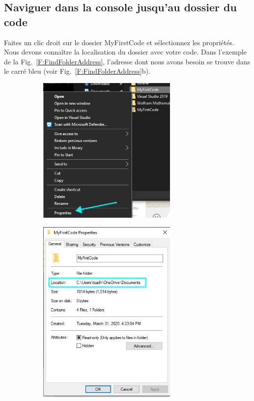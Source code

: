 \documentclass{article}
\newcommand\subfig[2]{{Fig.~\ref{#1}{#2}}}
\newcommand\fig[1]{{Fig.~\ref{#1}}}
\begin{document}
\subsection{Naviguer dans la console jusqu'au dossier du code\label{S:GoToFolder}}
Faites un clic droit sur le dossier MyFirstCode et sélectionnez les propriétés. Nous devons connaître la localisation du dossier avec votre code. Dans l'exemple de la \fig{F:FindFolderAddress}, l'adresse dont nous avons besoin se trouve dans le carré bleu (voir \subfig{F:FindFolderAddress}{b}).
\begin{figure}[H]
\begin{subfigure}[c]{0.5\textwidth}
\includegraphics[width=0.75\textwidth]{Plots/FirstCode_3Properties.jpg}
\end{subfigure}
\begin{subfigure}[c]{0.5\textwidth}
\includegraphics[width=0.75\textwidth]{Plots/FirstCode_4Path.jpg}

\end{subfigure}
\end{figure}
\end{document}
